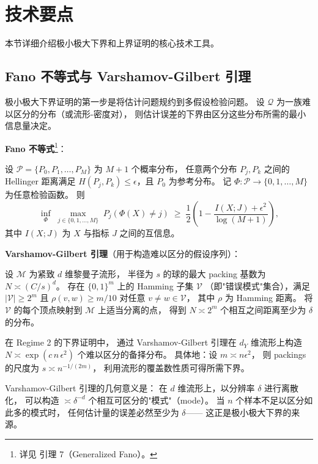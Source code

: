 \section{技术要点}\label{sec:ch2-technical}

本节详细介绍极小极大下界和上界证明的核心技术工具。

\subsection{Fano 不等式与 Varshamov-Gilbert 引理}\label{sec:ch2-fano}

极小极大下界证明的第一步是将估计问题规约到多假设检验问题。
设 $\mathcal{Q}$ 为一族难以区分的分布（或流形-密度对），
则估计误差的下界由区分这些分布所需的最小信息量决定。

\textbf{Fano 不等式}\footnote{详见 \citep{tang2025regression} 引理 7（Generalized Fano）。}：

\begin{Lemma}\label{def:lem-fano}
    设 $\mathcal{P} = \{P_0, P_1, \ldots, P_M\}$ 为 $M+1$ 个概率分布，
    任意两个分布 $P_j, P_k$ 之间的 Hellinger 距离满足
    $H(P_j, P_k) \leq \epsilon$，且 $P_0$ 为参考分布。
    记 $\Phi: \mathcal{P} \to \{0,1,\ldots,M\}$ 为任意检验函数。
    则
    \[
        \inf_{\Phi}\;
        \max_{j \in \{0,1,\ldots,M\}}
        \;P_j(\Phi(X) \neq j)
        \;\geq\;
        \frac{1}{2}\left(1 - \frac{I(X; J) + \epsilon^2}{\log(M+1)}\right),
    \]
    其中 $I(X; J)$ 为 $X$ 与指标 $J$ 之间的互信息。
\end{Lemma}

\textbf{Varshamov-Gilbert 引理}（用于构造难以区分的假设序列）：

\begin{Lemma}\label{def:lem-vg}
    设 $\mathcal{M}$ 为紧致 $d$ 维黎曼子流形，
    半径为 $s$ 的球的最大 packing 基数为 $N \asymp (C/s)^d$。
    存在 $\{0,1\}^m$ 上的 Hamming 子集 $\mathcal{V}$
    （即"错误模式"集合），满足
    $|\mathcal{V}| \geq 2^m$ 且
    $\rho(v, w) \geq m/10$ 对任意 $v \neq w \in \mathcal{V}$，
    其中 $\rho$ 为 Hamming 距离。
    将 $\mathcal{V}$ 的每个顶点映射到 $\mathcal{M}$ 上适当分离的点，
    得到 $N \asymp 2^m$ 个相互之间距离至少为 $\delta$ 的分布。
\end{Lemma}

\begin{Remark}\label{rem:vg-use}
    在 Regime 2 的下界证明中，
    通过 Varshamov-Gilbert 引理在 $d_Y$ 维流形上构造
    $N \asymp \exp(c\,n\,\epsilon^2)$ 个难以区分的备择分布。
    具体地：设 $m \asymp n\epsilon^2$，
    则 packings 的尺度为 $s \asymp n^{-1/(2m)}$，
    利用流形的覆盖数性质可得所需下界。

    Varshamov-Gilbert 引理的几何意义是：
    在 $d$ 维流形上，以分辨率 $\delta$ 进行离散化，
    可以构造 $\asymp \delta^{-d}$ 个相互可区分的"模式"（mode）。
    当 $n$ 个样本不足以区分如此多的模式时，
    任何估计量的误差必然至少为 $\delta$——
    这正是极小极大下界的来源。
\end{Remark}

